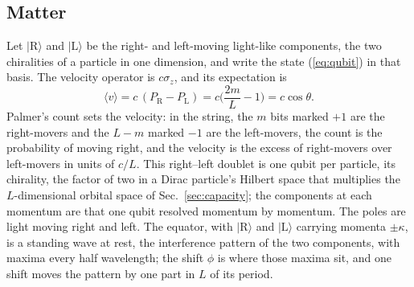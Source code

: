 \documentclass[aps,prd,twocolumn,superscriptaddress,nofootinbib]{revtex4-2}
\begin{document}
\subsection{Matter}
\label{sec:matter}

Let $|\mathrm{R}\rangle$ and $|\mathrm{L}\rangle$ be the right- and left-moving light-like components, the two chiralities of a particle in one dimension, and write the state (\ref{eq:qubit}) in that basis. The velocity operator is $c\sigma_z$, and its expectation is
\begin{equation}
\langle v\rangle = c\,(P_{\mathrm R} - P_{\mathrm L}) = c\Big(\frac{2m}{L} - 1\Big) = c\cos\theta .
\label{eq:velocity}
\end{equation}
Palmer's count sets the velocity: in the string, the $m$ bits marked $+1$ are the right-movers and the $L-m$ marked $-1$ are the left-movers, the count is the probability of moving right, and the velocity is the excess of right-movers over left-movers in units of $c/L$. This right--left doublet is one qubit per particle, its chirality, the factor of two in a Dirac particle's Hilbert space that multiplies the $L$-dimensional orbital space of Sec.~\ref{sec:capacity}; the components at each momentum are that one qubit resolved momentum by momentum. The poles are light moving right and left. The equator, with $|\mathrm{R}\rangle$ and $|\mathrm{L}\rangle$ carrying momenta $\pm\kappa$, is a standing wave at rest, the interference pattern of the two components, with maxima every half wavelength; the shift $\phi$ is where those maxima sit, and one shift moves the pattern by one part in $L$ of its period.
\end{document}
